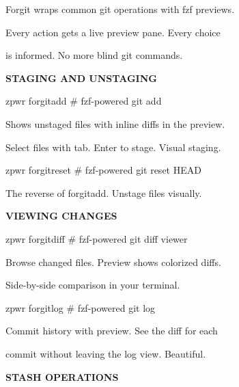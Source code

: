 \documentclass[11pt,a4paper,twoside]{book}
\begin{document}
\begin{codebox}
Forgit wraps common git operations with fzf previews.\\
\end{codebox}

Every action gets a live preview pane. Every choice

\begin{codebox}
is informed. No more blind git commands.\\
\end{codebox}


\vspace{12pt}
{\bfseries\color{neonyellow} STAGING AND UNSTAGING}\vspace{4pt}

\begin{codebox}
zpwr forgitadd            \# fzf-powered git add\\
\end{codebox}

Shows unstaged files with inline diffs in the preview.

Select files with tab. Enter to stage. Visual staging.

\begin{codebox}
zpwr forgitreset          \# fzf-powered git reset HEAD\\
\end{codebox}

The reverse of forgitadd. Unstage files visually.


\vspace{12pt}
{\bfseries\color{neonyellow} VIEWING CHANGES}\vspace{4pt}

\begin{codebox}
zpwr forgitdiff           \# fzf-powered git diff viewer\\
\end{codebox}

Browse changed files. Preview shows colorized diffs.

Side-by-side comparison in your terminal.

\begin{codebox}
zpwr forgitlog            \# fzf-powered git log\\
\end{codebox}

Commit history with preview. See the diff for each

commit without leaving the log view. Beautiful.


\vspace{12pt}
{\bfseries\color{neonyellow} STASH OPERATIONS}\vspace{4pt}
\end{document}
